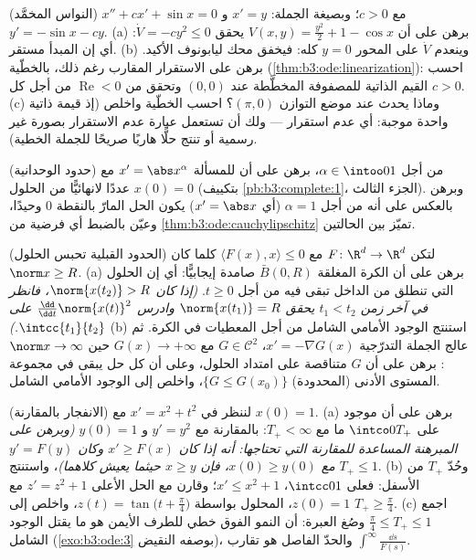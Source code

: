 \begin{exercise}[$\star\star\star$]\label{exo:b3:ode:8}
(النواس المخمَّد) $x'' + cx' + \sin x = 0$ مع $c > 0$؛ وبصيغة الجملة: $x' = y$
و $y' = -\sin x - cy$.
(a) برهن على أن $V(x, y) = \frac{y^2}2 + 1 - \cos x$ يحقق $\dot
V = -cy^2 \leq 0$: أي إن المبدأ مستقر.
(b) وينعدم $\dot V$ على المحور $y = 0$ كله: فيخفق محك
ليابونوف الأكيد. برهن على الاستقرار المقارب رغم ذلك، بالخطّية
(\cref{thm:b3:ode:linearization}): احسب القيم الذاتية للمصفوفة المخطَّطة عند
$(0,0)$ وتحقق من $\operatorname{Re} < 0$ من أجل كل $c > 0$.
(c) وماذا يحدث عند موضع التوازن $(\pi, 0)$؟ احسب الخطّية واخلص
(إذ قيمة ذاتية واحدة موجبة: أي عدم استقرار --- ولك أن تستعمل
عبارة عدم الاستقرار بصورة غير رسمية أو تنتج حلًّا هاربًا
صريحًا للجملة الخطية).
\end{exercise}

\begin{exercise}[$\star\star$]\label{exo:b3:ode:9}
(حدود الوحدانية) من أجل $\alpha \in \intoo01$، برهن على أن للمسألة $x' = \abs x^{\alpha}$ مع
$x(0) = 0$ عددًا لانهائيًّا من الحلول (بتكييف \cref{pb:b3:complete:1}، الجزء
الثالث). وبرهن بالعكس على أنه من أجل $\alpha = 1$ (أي $x' = \abs
x$)
يكون الحل المارّ بالنقطة $0$ وحيدًا، وعيّن بالضبط أي فرضية من
\cref{thm:b3:ode:cauchylipschitz} تميّز بين الحالتين.
\end{exercise}

\begin{exercise}[$\star\star\star$]\label{exo:b3:ode:10}
(الحدود القبلية تحبس الحلول) لتكن $F \colon \R^d \to \R^d$  مع
$\langle F(x), x\rangle \leq 0$ كلما كان $\norm x \geq R$.
(a) برهن على أن الكرة المغلقة $\bar B(0, R)$ صامدة إيجابيًّا:
أي إن الحلول التي تنطلق من الداخل تبقى فيه من أجل $t \geq
0$.
\emph{(إذا كان $\norm{x(t_2)} > R$، فانظر في آخر زمن $t_1 < t_2$ يحقق
$\norm{x(t_1)} = R$ وادرس $\frac{\dd}{\dd t}\norm{x(t)}^2$ على $\intcc{t_1}{t_2}$.)}
(b) استنتج الوجود الأمامي الشامل من أجل المعطيات في الكرة. ثم
عالج الجملة التدرّجية $x' = -\nabla G(x)$، $G \in
\mathcal C^2$ مع $G(x) \to +\infty$ حين $\norm x \to
\infty$:
برهن على أن $G$ متناقصة على امتداد الحلول، وعلى أن كل حل يبقى
في مجموعة المستوى الأدنى (المحدودة) $\{G \leq
G(x_0)\}$، واخلص إلى الوجود
الأمامي الشامل.
\end{exercise}

\begin{exercise}[$\star\star$]\label{exo:b3:ode:11}
(الانفجار بالمقارنة) لننظر في $x' = x^2 + t^2$ مع $x(0) =
1$.
(a) برهن على أن  موجود على $\intco0{T_+}$ ما مع
$T_+ < \infty$: بالمقارنة مع $y' = y^2$ و $y(0) = 1$ \emph{(وبرهن
على المبرهنة المساعدة للمقارنة التي تحتاجها: أنه إذا كان $x' \geq
F(x)$
وكان $y' = F(y)$ مع $x(0) \geq y(0)$، فإن $x \geq
y$ حيثما يعيش
كلاهما)}، واستنتج $T_+ \leq 1$.
(b) وحُدّ $T_+$ من الأسفل: فعلى $\intcc01$، $x' \leq x^2 +
1$؛ وقارن مع
الحل الأعلى $z' = z^2 + 1$ مع $z(0) =
1$، المحلول بواسطة $z(t) = \tan\bigl(t + \frac\pi4\bigr)$،
واخلص إلى $T_+ \geq \frac\pi4$.
(c) اجمع $\frac\pi4 \leq T_+ \leq 1$ وصُغ العبرة: أن النمو الفوق خطي للطرف الأيمن
هو ما يقتل الوجود الشامل (\cref{exo:b3:ode:3} بوصفه النقيض)، والحدّ
الفاصل هو تقارب $\int^{\infty}\frac{\dd s}{F(s)}$.
\end{exercise}

